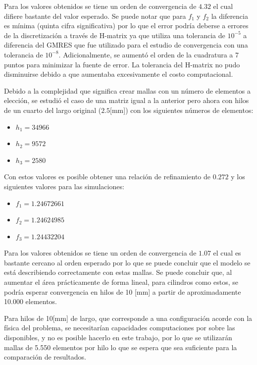 \documentclass[12pt,letterpaper]{article}
\numberwithin{equation}{section}
\begin{document}
Para los valores obtenidos se tiene un orden de convergencia de $4.32$ el cual difiere bastante del valor esperado. Se puede notar que para $f_1$ y $f_2$ la diferencia es mínima (quinta cifra significativa) por lo que el error podría deberse a errores de la discretización a través de H-matrix ya que utiliza una tolerancia de $10^{-5}$ a diferencia del GMRES que fue utilizado para el estudio de convergencia con una tolerancia de $10^{-8}$. Adicionalmente, se aumentó el orden de la cuadratura a 7 puntos para minimizar la fuente de error. La tolerancia del H-matrix no pudo disminuirse debido a que aumentaba excesivamente el costo computacional.

Debido a la complejidad que significa crear mallas con un número de elementos a elección, se estudió el caso de una matriz igual a la anterior pero ahora con hilos de un cuarto del largo original ($2.5$[mm]) con los siguientes números de elementos:

\begin{itemize}
	\item $h_1 = 34966$
	\item $h_2 = 9572$
	\item $h_3 = 2580$
\end{itemize}

Con estos valores es posible obtener una relación de refinamiento de $0.272$ y los siguientes valores para las simulaciones:
     
\begin{itemize}
	\item $f_1 = 1.24672661$
	\item $f_2 = 1.24624985$
	\item $f_3 = 1.24432204$
\end{itemize}

Para los valores obtenidos se tiene un orden de convergencia de $1.07$ el cual es bastante cercano al orden esperado por lo que se puede concluir que el modelo se está describiendo correctamente con estas mallas. Se puede concluir que, al aumentar el área prácticamente de forma lineal, para cilindros como estos, se podría esperar convergencia en hilos de 10 [mm] a partir de aproximadamente 10.000 elementos.

Para hilos de 10[mm] de largo, que corresponde a una configuración acorde con la física del problema, se necesitarían capacidades computaciones por sobre las disponibles, y no es posible hacerlo en este trabajo, por lo que se utilizarán mallas de 5.550 elementos por hilo lo que se espera que sea suficiente para la comparación de resultados.
\end{document}
